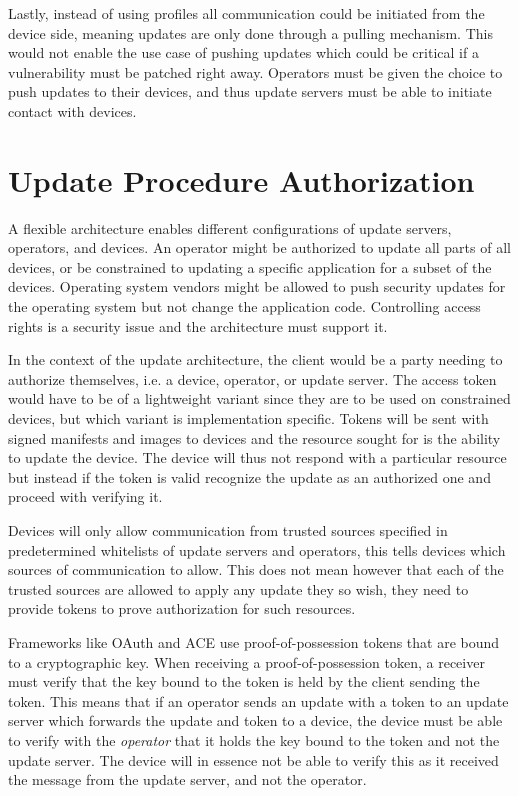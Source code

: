 \documentclass[0-thesis.tex]{subfiles}
\begin{document}
Lastly, instead of using profiles all communication could be initiated from the device
side, meaning updates are only done through a pulling mechanism. This would not enable the
use case of pushing updates which could be critical if a vulnerability must be patched
right away. Operators must be given the choice to push updates to their devices, and thus
update servers must be able to initiate contact with devices.

\section{Update Procedure Authorization}
\label{sec:authorization}
A flexible architecture enables different configurations of update servers, operators, and
devices. An operator might be authorized to update all parts of all devices, or be
constrained to updating a specific application for a subset of the devices. Operating
system vendors might be allowed to push security updates for the operating system but not
change the application code. Controlling access rights is a security issue and the
architecture must support it.

In the context of the update architecture, the client would be a party needing to
authorize themselves, i.e. a device, operator, or update server. The access token would
have to be of a lightweight variant since they are to be used on constrained devices, but
which variant is implementation specific. Tokens will be sent with signed manifests and
images to devices and the resource sought for is the ability to update the device. The
device will thus not respond with a particular resource but instead if the token is valid
recognize the update as an authorized one and proceed with verifying it. 

Devices will only allow communication from trusted sources specified in predetermined
whitelists of update servers and operators, this tells devices which sources of
communication to allow. This does not mean however that each of the trusted sources are
allowed to apply any update they so wish, they need to provide tokens to prove
authorization for such resources.

Frameworks like OAuth and ACE use proof-of-possession tokens that are bound to a
cryptographic key. When receiving a proof-of-possession token, a receiver must verify that
the key bound to the token is held by the client sending the token. This means that if an
operator sends an update with a token to an update server which forwards the update and
token to a device, the device must be able to verify with the \textit{operator} that it
holds the key bound to the token and not the update server. The device will in essence not
be able to verify this as it received the message from the update server, and not the
operator.
\end{document}
